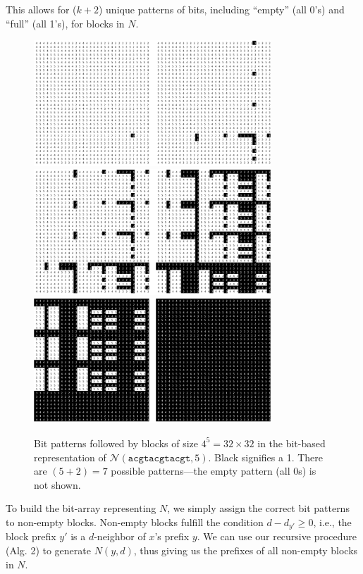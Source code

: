 \documentclass[conference]{IEEEtran}
\begin{document}
\begin{enumerate}[label={\em \arabic*.}]
			This allows for ($k + 2$) unique patterns of bits, including ``empty'' (all 0's) and ``full'' (all 1's), for blocks in $N$.\newline
			\begin{figure}[h]
				\centering
				\label{fig:bit_patterns}
				\includegraphics[width=3.5in]{img/0-1}\vspace*{5pt}
				\includegraphics[width=3.5in]{img/2-3}\vspace*{5pt}
				\includegraphics[width=3.5in]{img/4-5}
				\caption{Bit patterns followed by blocks of size $4^{5}=32\times32$ in the bit-based representation of $\mathcal{N}(\texttt{acgtacgtacgt},5)$. Black signifies a 1. There are $(5+2)=7$ possible patterns---the empty pattern (all 0s) is not shown.}
				\end{figure}
			\newpage
			To build the bit-array representing $N$, we simply assign the correct bit patterns to non-empty blocks. Non-empty blocks fulfill the condition $d-d_{y'} \geq 0$, i.e., the block prefix $y'$ is a $d$-neighbor of $x$'s prefix $y$. We can use our recursive procedure (Alg. 2) to generate $N(y,d)$, thus giving us the prefixes of all non-empty blocks in $N$.\newline


\end{enumerate}
\end{document}
